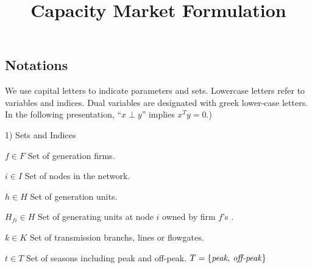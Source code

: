 \documentclass[12pt,onecolumn]{IEEEtran}
\theoremstyle{plain}
\theoremstyle{definition}
\begin{document}
\title{Capacity Market Formulation}
\date{}

%
%

\maketitle

\subsection{Notations}
We use capital letters to indicate parameters and sets. 
Lowercase letters refer to variables and indices. 
Dual variables are designated with greek lower-case letters. 
In the following presentation, ``$x \perp y$'' implies $x^Ty=0$.)

1) Sets and Indices
\begin{IEEEdescription}
\item[$f \in F$] Set of generation firms.
\item[$i \in I$] Set of nodes in the network.
\item[$h \in H$] Set of generation units.
\item[$H_{fi} \in H$] Set of generating units at node $i$ owned by firm $f$'s .
\item[$k \in K$] Set of transmission branchs, lines or flowgates.
\item[$t \in T$] Set of seasons including peak and off-peak. $T = \{\text{\textit{peak, off-peak}}\}$
\end{IEEEdescription}
\end{document}
